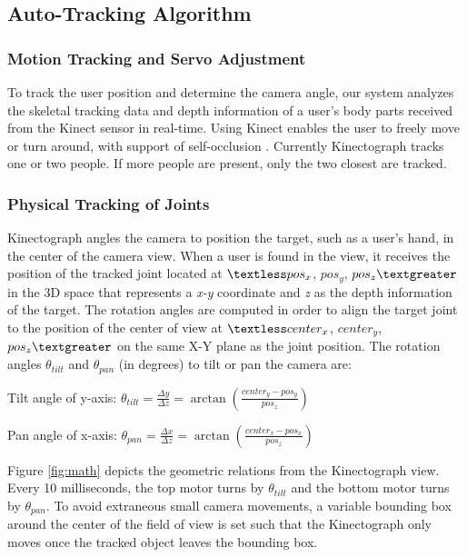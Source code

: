 \subsection{Auto-Tracking Algorithm}

\subsubsection{Motion Tracking and Servo Adjustment}
To track the user position and determine the camera angle, our system analyzes the skeletal tracking data and depth information of a user’s body parts received from the Kinect sensor in real-time. Using Kinect enables the user to freely move or turn around, with support of self-occlusion \cite{Shotton:2011ud}. Currently Kinectograph tracks one or two people. If more people are present, only the two closest are tracked.

\subsubsection{Physical Tracking of Joints}
Kinectograph angles the camera to position the target, such as a user's hand, in the center of the camera view. When a user is found in the view, it receives the position of the tracked joint located at $\textless pos_{x}$, $pos_{y}$, $pos_{z} \textgreater$ in the 3D space that represents a {\em x-y} coordinate and {\em z} as the depth information of the target. The rotation angles are computed in order to align the target joint to the position of the center of view at $\textless center_{x}$, $center_{y}$, $pos_{z}\textgreater$  on the same X-Y plane as the joint position. The rotation angles $\theta_{tilt}$ and $\theta_{pan}$ (in degrees) to tilt or pan the camera are:

\vspace{12pt}
Tilt angle of y-axis:
$\theta_{tilt}=\frac{\Delta y}{\Delta z}=\arctan{(\frac{center_{y}-pos_{y}}{pos_{z}})}$

\vspace{12pt}
Pan angle of x-axis:
$\theta_{pan}=\frac{\Delta x}{\Delta z}=\arctan{(\frac{center_{x}-pos_{x}}{pos_{z}})}$
\vspace{12pt}

Figure \ref{fig:math} depicts the geometric relations from the Kinectograph view. Every 10 milliseconds, the top motor turns by $\theta_{tilt}$ and the bottom motor turns by $\theta_{pan}$. To avoid extraneous small camera movements, a variable bounding box around the center of the field of view is set such that the Kinectograph only moves once the tracked object leaves the bounding box.

